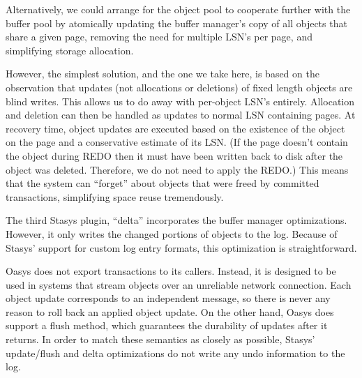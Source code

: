 \documentclass[letterpaper,twocolumn,10pt]{article}
\newcommand{\yad}{Stasys\xspace}
\newcommand{\yads}{Stasys'\xspace}
\newcommand{\oasys}{Oasys\xspace}
\begin{document}
Alternatively, we could arrange for the object pool to cooperate 
further with the buffer pool by atomically updating the buffer 
manager's copy of all objects that share a given page, removing the 
need for multiple LSN's per page, and simplifying storage allocation.

However, the simplest solution, and the one we take here, is based on the observation that
updates (not allocations or deletions) of fixed length objects are blind writes.
This allows us to do away with per-object LSN's entirely.  Allocation and deletion can then be handled
as updates to normal LSN containing pages.  At recovery time, object
updates are executed based on the existence of the object on the page
and a conservative estimate of its LSN.  (If the page doesn't contain
the object during REDO then it must have been written back to disk
after the object was deleted.  Therefore, we do not need to apply the
REDO.)  This means that the system can ``forget'' about objects that 
were freed by committed transactions, simplifying space reuse 
tremendously.

The third \yad plugin, ``delta'' incorporates the buffer
manager optimizations.  However, it only writes the changed portions of
objects to the log.  Because of \yads support for custom log entry
formats, this optimization is straightforward.

%

\oasys does not export transactions to its callers.  Instead, it
is designed to be used in systems that stream objects over an
unreliable network connection.  Each object update corresponds to an
independent message, so there is never any reason to roll back an
applied object update.  On the other hand, \oasys does support a
flush method, which guarantees the durability of updates after it
returns.  In order to match these semantics as closely as possible,
\yads update/flush and delta optimizations do not write any 
undo information to the log.  
\end{document}
